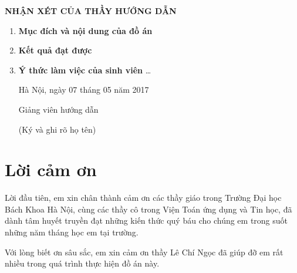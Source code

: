 \documentclass[14pt, oneside, a4paper, openany]{scrartcl}
\begin{document}
\newpage
\thispagestyle{empty}
\centerline{\Large\bf NHẬN XÉT CỦA THẦY HƯỚNG DẪN}
\begin{enumerate}
	\item \textbf{Mục đích và nội dung của đồ án}
	\newline
	\newline
	\newline
	\newline
	\item \textbf{Kết quả đạt được}
	\newline
	\newline
	\newline
	\newline
	\item \textbf{Ý thức làm việc của sinh viên} \ldots
	\newline
	\newline
	\newline
	\newline
	\newline
	
	\begin{flushright}
		Hà Nội, ngày 07 tháng 05 năm 2017
	\end{flushright}
	\hspace{95 mm}Giảng viên hướng dẫn
	
	\hspace{95 mm}(Ký và ghi rõ họ tên)
\end{enumerate}

\newpage
{}
\thispagestyle{empty}
\tableofcontents

\newpage
\thispagestyle{empty}
\listoffigures

\newpage
\thispagestyle{empty}
\listoftables

\newpage
\thispagestyle{empty}
\listofalgorithms
{}

\newpage
{}
\section{Lời cảm ơn}
Lời đầu tiên, em xin chân thành cảm ơn các thầy giáo trong Trường Đại học Bách Khoa Hà Nội, cùng các thầy cô trong Viện Toán ứng dụng và Tin học, đã dành tâm huyết truyền đạt những kiến thức quý báu cho chúng em trong suốt những năm tháng học em tại trường.

Với lòng biết ơn sâu sắc, em xin cảm ơn thầy Lê Chí Ngọc đã giúp đỡ em rất nhiều trong quá trình thực hiện đồ án này.
\end{document}
